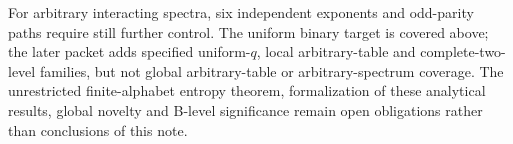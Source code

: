 For arbitrary interacting spectra, six independent exponents and odd-parity
paths require still further control.  The uniform binary target is covered
above; the later packet adds specified uniform-$q$, local arbitrary-table
and complete-two-level families, but not global arbitrary-table or
arbitrary-spectrum coverage.  The unrestricted finite-alphabet entropy theorem,
formalization of these analytical results, global novelty and B-level
significance remain open obligations rather than conclusions of this note.
